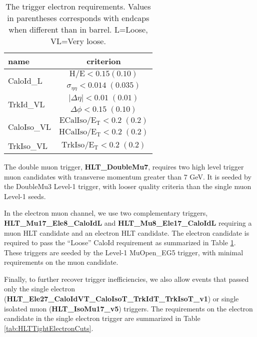 \begin{table}[htb]
 \caption{The trigger electron requirements. Values in parentheses corresponds with endcaps when different than in barrel. L=Loose, VL=Very loose.}
 \label{tab:HLTElectronCuts}
 \centering
 \begin{tabular}{|l||c|}
   \hline
   name                       &  criterion \\
   \hline \hline
   \multirow{2}{*}{CaloId\_L} & $\mathrm{H/E < 0.15 (0.10) }$ \\
                               & $\sigma_{\eta\eta}\mathrm{< 0.014\;(0.035)}$ \\
    \hline
    \multirow{2}{*}{TrkId\_VL} & $|\Delta\eta|\mathrm{< 0.01\; (0.01)}$ \\
                               & $\Delta\phi\mathrm{< 0.15\;(0.10)}$  \\
    \hline
    \multirow{2}{*}{CaloIso\_VL} & $\mathrm{ECalIso/E_T <0.2\;(0.2)}$ \\
                                 & $\mathrm{HCalIso/E_T <0.2\;(0.2)}$ \\    
    \hline
    TrkIso\_VL                   & $\mathrm{TrkIso/E_T <0.2\;(0.2)}$ \\

   \hline
 \end{tabular}
\end{table}

 
The double muon trigger, {\bf HLT\_DoubleMu7},  requires two high level trigger 
muon candidates with transverse momentum greater than $7$ GeV. It is seeded 
by the DoubleMu3 Level-1 trigger, with looser quality criteria than the
single muon Level-1 seeds. 
 
In the electron muon channel, we use two complementary triggers, 
{\bf HLT\_Mu17\_Ele8\_CaloIdL} and {\bf HLT\_Mu8\_Ele17\_CaloIdL} requiring
a muon HLT candidate and an electron HLT candidate. The electron
candidate is required to pass the ``Loose'' CaloId requirement as 
summarized in Table \ref{tab:HLTElectronCuts}. These triggers are seeded by 
the Level-1 MuOpen\_EG5 trigger, with minimal requirements on the muon candidate.

Finally, to further recover trigger inefficiencies, we also allow events that 
passed only the single electron 
({\bf HLT\_Ele27\_CaloIdVT\_CaloIsoT\_TrkIdT\_TrkIsoT\_v1}) or single 
isolated muon ({\bf HLT\_IsoMu17\_v5}) triggers. The requirements on the 
electron candidate in the single electron trigger are summarized in 
Table \ref{tab:HLTTightElectronCuts}. 

